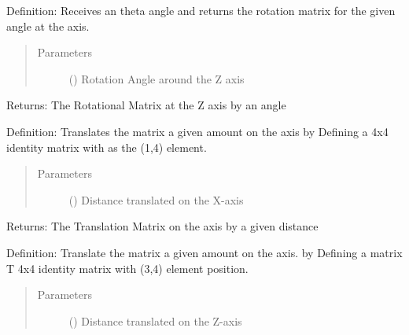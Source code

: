 \documentclass[letterpaper,10pt,english,openany,oneside]{sphinxmanual}
\begin{document}
\begin{fulllineitems}
\begin{fulllineitems}
\label{\detokenize{ForwardKinematics:Forward_Kinematics.ForwardKinematics.rot_z}}
Definition: Receives an theta angle and returns the rotation matrix for the given angle at the  axis.
\begin{quote}\begin{description}
\item[{Parameters}] \leavevmode
{} () \textendash{} Rotation Angle around the Z axis

\end{description}\end{quote}

Returns: The Rotational Matrix at the Z axis by an  angle

\end{fulllineitems}


\begin{fulllineitems}
\label{\detokenize{ForwardKinematics:Forward_Kinematics.ForwardKinematics.trans_x}}
Definition: Translates the matrix a given amount  on the  axis by Defining a 4x4 identity
matrix with  as the (1,4) element.
\begin{quote}\begin{description}
\item[{Parameters}] \leavevmode
{} () \textendash{} Distance translated on the X-axis

\end{description}\end{quote}

Returns: The Translation Matrix on the  axis by a given distance

\end{fulllineitems}


\begin{fulllineitems}
\label{\detokenize{ForwardKinematics:Forward_Kinematics.ForwardKinematics.trans_z}}
Definition: Translate the matrix a given amount  on the  axis. by Defining a matrix T 4x4 identity
matrix with  (3,4) element position.
\begin{quote}\begin{description}
\item[{Parameters}] \leavevmode
{} () \textendash{} Distance translated on the Z-axis


\end{description}
\end{quote}
\end{fulllineitems}
\end{fulllineitems}
\end{document}
